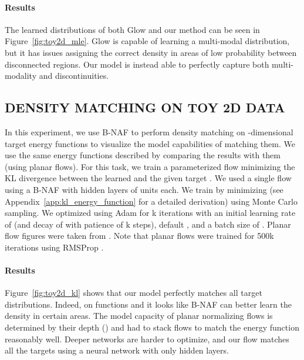 \documentclass[letterpaper]{article}
\begin{document}
\paragraph{Results}
The learned distributions of both Glow and our method can be seen in Figure~\ref{fig:toy2d_mle}. Glow is capable of learning a multi-modal distribution, but it has issues assigning the correct density in areas of low probability between disconnected regions. Our model is instead able to perfectly capture both multi-modality and discontinuities.

\subsection{DENSITY MATCHING ON TOY 2D DATA} \label{sec:toy2d_kl}
In this experiment, we use B-NAF to perform density matching on -dimensional target energy functions to visualize the model capabilities of matching them. We use the same energy functions described by \citet{rezende2015variational} comparing the results with them (using planar flows). For this task, we train a parameterized flow minimizing the KL divergence between the learned  and the given target . We used a single flow using a B-NAF with  hidden layers of  units each. We train by minimizing  (see Appendix~\ref{app:kl_energy_function} for a detailed derivation) using Monte Carlo sampling. We optimized using Adam for k iterations with an initial learning rate of  (and decay of  with patience of k steps), default , and a batch size of . Planar flow figures were taken from \citet{chen2018neural}. Note that planar flows were trained for 500k iterations using RMSProp \citep{tieleman2012lecture}.

\paragraph{Results}
Figure~\ref{fig:toy2d_kl} shows that our model perfectly matches all target distributions. Indeed, on functions  and  it looks like B-NAF can better learn the density in certain areas. The model capacity of planar normalizing flows is determined by their depth () and \citet{rezende2015variational} had to stack  flows to match the energy function reasonably well. Deeper networks are harder to optimize, and our flow matches all the targets using a neural network with only  hidden layers.
\end{document}
